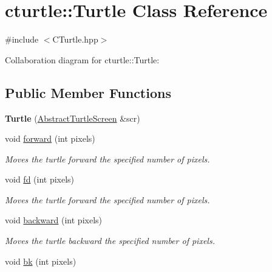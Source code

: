 \hypertarget{classcturtle_1_1Turtle}{}\section{cturtle\+:\+:Turtle Class Reference}
\label{classcturtle_1_1Turtle}


{\ttfamily \#include $<$C\+Turtle.\+hpp$>$}



Collaboration diagram for cturtle\+:\+:Turtle\+:
\subsection*{Public Member Functions}
\begin{DoxyCompactItemize}
\item 
\mbox{\label{classcturtle_1_1Turtle_af819a08c50a1eaceae945e69c4c7968a}} 
{\bfseries Turtle} (\hyperlink{classcturtle_1_1AbstractTurtleScreen}{Abstract\+Turtle\+Screen} \&scr)
\item 
\mbox{\label{classcturtle_1_1Turtle_a472d13726408a2c4f0820a9365d7822b}} 
void \hyperlink{classcturtle_1_1Turtle_a472d13726408a2c4f0820a9365d7822b}{forward} (int pixels)
\begin{DoxyCompactList}\small\item\em Moves the turtle forward the specified number of pixels. \end{DoxyCompactList}\item 
void \hyperlink{classcturtle_1_1Turtle_a2a9fa6b316c96af547eb90b44fbacdc0}{fd} (int pixels)
\begin{DoxyCompactList}\small\item\em Moves the turtle forward the specified number of pixels. \end{DoxyCompactList}\item 
\mbox{\label{classcturtle_1_1Turtle_a2fd24ae80f39ed0598e1d3b2458b6b7b}} 
void \hyperlink{classcturtle_1_1Turtle_a2fd24ae80f39ed0598e1d3b2458b6b7b}{backward} (int pixels)
\begin{DoxyCompactList}\small\item\em Moves the turtle backward the specified number of pixels. \end{DoxyCompactList}\item 
void \hyperlink{classcturtle_1_1Turtle_a3f1ce4b0c550d890f8bfc7e6a02ea1ef}{bk} (int pixels)

\end{DoxyCompactItemize}
